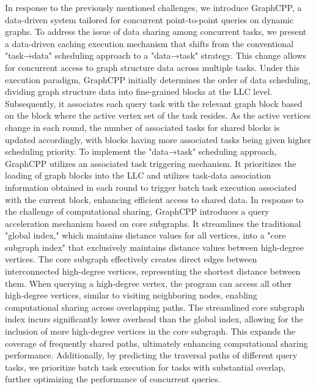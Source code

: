 \documentclass[lettersize,journal]{IEEEtran} %
\begin{document}
In response to the previously mentioned challenges, we introduce GraphCPP, a data-driven system tailored for concurrent point-to-point queries on dynamic graphs. To address the issue of data sharing among concurrent tasks, we present a data-driven caching execution mechanism that shifts from the conventional "task→data" scheduling approach to a "data→task" strategy. This change allows for concurrent access to graph structure data across multiple tasks. Under this execution paradigm, GraphCPP initially determines the order of data scheduling, dividing graph structure data into fine-grained blocks at the LLC level. Subsequently, it associates each query task with the relevant graph block based on the block where the active vertex set of the task resides. As the active vertices change in each round, the number of associated tasks for shared blocks is updated accordingly, with blocks having more associated tasks being given higher scheduling priority. To implement the "data→task" scheduling approach, GraphCPP utilizes an associated task triggering mechanism. It prioritizes the loading of graph blocks into the LLC and utilizes task-data association information obtained in each round to trigger batch task execution associated with the current block, enhancing efficient access to shared data. In response to the challenge of computational sharing, GraphCPP introduces a query acceleration mechanism based on core subgraphs. It streamlines the traditional "global index," which maintains distance values for all vertices, into a "core subgraph index" that exclusively maintains distance values between high-degree vertices. The core subgraph effectively creates direct edges between interconnected high-degree vertices, representing the shortest distance between them. When querying a high-degree vertex, the program can access all other high-degree vertices, similar to visiting neighboring nodes, enabling computational sharing across overlapping paths. The streamlined core subgraph index incurs significantly lower overhead than the global index, allowing for the inclusion of more high-degree vertices in the core subgraph. This expands the coverage of frequently shared paths, ultimately enhancing computational sharing performance. Additionally, by predicting the traversal paths of different query tasks, we prioritize batch task execution for tasks with substantial overlap, further optimizing the performance of concurrent queries.
\end{document}
